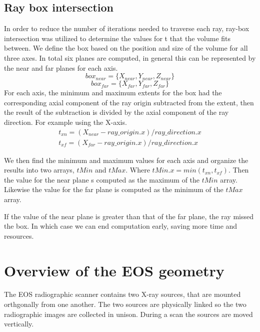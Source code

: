 \documentclass[11pt,twocolumn]{article}
\begin{document}
\subsection{Ray box intersection}
In order to reduce the number of iterations needed to traverse each ray, ray-box intersection was utilized to 
determine the values for t that the volume fits between. We define the box based on the position and size of the volume
for all three axes. In total six planes are computed, in general this can be represented by the near and far planes
for each axis.
\begin{equation}
  box_{near} = \{X_{near}, Y_{near}, Z_{near}\}
\end{equation}
\begin{equation}
  box_{far} = \{X_{far}, Y_{far}, Z_{far}\}
\end{equation}
For each axis, the minimum and maximum extents for the box had the corresponding axial component 
of the ray origin subtracted from the extent, then the result of the subtraction is divided by the axial component 
of the ray direction. For example using the X-axis.
\begin{gather*}
  t_{xn} = (X_{near} - ray\_origin.x) / ray\_direction.x\\
  t_{xf} = (X_{far} - ray\_origin.x) / ray\_direction.x
\end{gather*}

We then find the minimum and maximum values for each axis and organize the results into two arrays, $tMin$ and $tMax$.
Where $tMin.x = min(t_{xn},t_{xf})$. Then the value for the near plane s computed as the maximum of the
$tMin$ array. Likewise the value for the far plane is computed as the minimum of the $tMax$ array.

If the value of the near plane is greater than that of the far plane, the ray missed the box. In which case we can end
computation early, saving more time and resources. 
\cite{glassnerIntro}

\section{Overview of the EOS\textregistered{} geometry}

The EOS\textregistered{} radiographic scanner contains two X-ray sources, that are mounted orthgonally from one
another. The two sources are physically linked so the two radiographic images are collected in unison. During a 
scan the sources are moved vertically.
\end{document}
